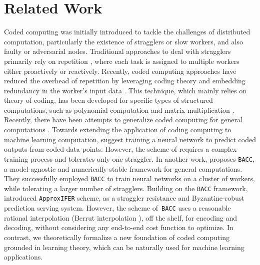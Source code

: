 \documentclass{article}
\begin{document}
\section{Related Work}
Coded computing was initially introduced to tackle the challenges of distributed computation, particularly the existence of stragglers or slow workers, and also faulty or adversarial nodes.   Traditional approaches to deal with stragglers primarily rely on repetition \citep{zaharia2008improving, dean2013tail,suresh2015c3,shah2015redundant,gardner2015reducing,chaubey2015replicated}, where each task is assigned to multiple workers either proactively or reactively.  Recently, coded computing approaches have reduced the overhead of repetition  by leveraging coding theory and embedding redundancy in the worker's input data \citep{jahani2022berrut,yu2019lagrange,yu2017polynomial,jahani2018codedsketch,li2018near,das2019random,ramamoorthysurvey,karakus2017straggler,Grad_Dimakis}.  This technique, which mainly relies on theory of coding, has been developed 
for specific types of structured computations, such as polynomial computation and matrix multiplication \citep{yu2017polynomial, yu2019lagrange, ramamoorthy2021numerically,high,entangle,das2019random,d2020gasp,aliasgari2019private,fahimappx}. 
Recently, there have been attempts to generalize coded computing for general computations \citep{jahani2022berrut,kosaian2019parity,SoAppxMPC,codedpri}. Towards extending the application of coding computing to machine learning computation, \citet{kosaian2019parity} suggest training a neural network to predict coded outputs from coded data points. However, the scheme of \citet{kosaian2019parity} requires a complex training process and tolerates only one straggler. In another work,  \citet{jahani2022berrut} proposes \texttt{BACC}, a model-agnostic and numerically stable framework for general computations. They successfully employed \texttt{BACC} to train neural networks on a cluster of workers, while tolerating a larger number of stragglers. Building on the \texttt{BACC} framework, \citet{soleymani2022approxifer}
introduced \texttt{ApproxIFER} scheme, as a straggler resistance and Byzantine-robust prediction serving system. However, the scheme of~\texttt{BACC} uses a reasonable rational interpolation (Berrut interpolation \citep{berrut1988rational}), off the shelf, 
for encoding and decoding, without considering any end-to-end cost function to optimize. In contrast, we theoretically formalize a new foundation of coded computing grounded in learning theory, which can be naturally used for machine learning applications. 
\end{document}
